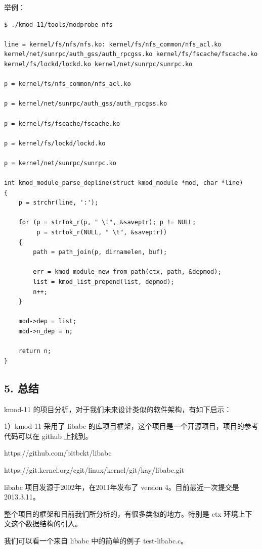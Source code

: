 \documentclass[11pt,a4paper]{article}
\begin{document}
举例：

{\begin{shaded}\begin{verbatim}
$ ./kmod-11/tools/modprobe nfs

line = kernel/fs/nfs/nfs.ko: kernel/fs/nfs_common/nfs_acl.ko kernel/net/sunrpc/auth_gss/auth_rpcgss.ko kernel/fs/fscache/fscache.ko kernel/fs/lockd/lockd.ko kernel/net/sunrpc/sunrpc.ko

p = kernel/fs/nfs_common/nfs_acl.ko

p = kernel/net/sunrpc/auth_gss/auth_rpcgss.ko

p = kernel/fs/fscache/fscache.ko

p = kernel/fs/lockd/lockd.ko

p = kernel/net/sunrpc/sunrpc.ko

int kmod_module_parse_depline(struct kmod_module *mod, char *line)
{
    p = strchr(line, ':');

    for (p = strtok_r(p, " \t", &saveptr); p != NULL;
         p = strtok_r(NULL, " \t", &saveptr)) 
    {
        path = path_join(p, dirnamelen, buf);

        err = kmod_module_new_from_path(ctx, path, &depmod);
        list = kmod_list_prepend(list, depmod);
        n++;
    }

    mod->dep = list;
    mod->n_dep = n;

    return n;
}
\end{verbatim}\end{shaded}}
\subsection{5. 总结}

kmod-11 的项目分析，对于我们未来设计类似的软件架构，有如下启示：

1）kmod-11 采用了 libabc
的库项目框架，这个项目是一个开源项目，项目的参考代码可以在 github 上找到。

https://github.com/bitbckt/libabc

https://git.kernel.org/cgit/linux/kernel/git/kay/libabc.git

libabc 项目发源于2002年，在2011年发布了 version
4。目前最近一次提交是2013.3.11。

整个项目的框架和目前我们所分析的，有很多类似的地方。特别是 ctx
环境上下文这个数据结构的引入。

我们可以看一个来自 libabc 中的简单的例子 test-libabc.c。
\end{document}
